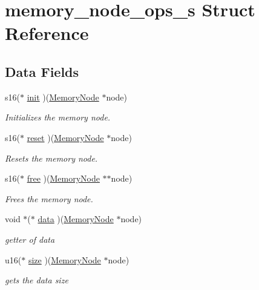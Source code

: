 \hypertarget{structmemory__node__ops__s}{}\section{memory\+\_\+node\+\_\+ops\+\_\+s Struct Reference}
\label{structmemory__node__ops__s}
\subsection*{Data Fields}
\begin{DoxyCompactItemize}
\item 
s16($\ast$ \hyperlink{structmemory__node__ops__s_a5ebfbdad36c43579a4bd90d91a61c11b}{init} )(\hyperlink{structmemory__node__s}{Memory\+Node} $\ast$node)
\begin{DoxyCompactList}\small\item\em Initializes the memory node. \end{DoxyCompactList}\item 
s16($\ast$ \hyperlink{structmemory__node__ops__s_a50b5474576ccd1add08efa49a64d65a4}{reset} )(\hyperlink{structmemory__node__s}{Memory\+Node} $\ast$node)
\begin{DoxyCompactList}\small\item\em Resets the memory node. \end{DoxyCompactList}\item 
s16($\ast$ \hyperlink{structmemory__node__ops__s_a0356db4d1c58d08229e1f5b02002bac2}{free} )(\hyperlink{structmemory__node__s}{Memory\+Node} $\ast$$\ast$node)
\begin{DoxyCompactList}\small\item\em Frees the memory node. \end{DoxyCompactList}\item 
void $\ast$($\ast$ \hyperlink{structmemory__node__ops__s_a36adf5dc8abc5a2cffb136827b5bbb75}{data} )(\hyperlink{structmemory__node__s}{Memory\+Node} $\ast$node)
\begin{DoxyCompactList}\small\item\em getter of data \end{DoxyCompactList}\item 
u16($\ast$ \hyperlink{structmemory__node__ops__s_ab71d9dc13a2a637550016d5bac6af7d3}{size} )(\hyperlink{structmemory__node__s}{Memory\+Node} $\ast$node)
\begin{DoxyCompactList}\small\item\em gets the data size \end{DoxyCompactList}\item 
$$
\end{DoxyCompactItemize}
